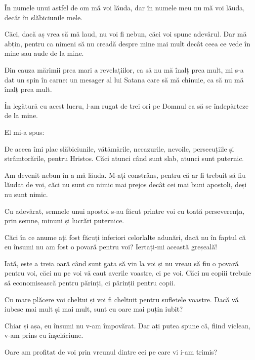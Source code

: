 {În numele unui astfel de om mă voi lăuda, dar în numele meu nu mă voi lăuda, decât în slăbiciunile mele.

Căci, dacă aș vrea să mă laud, nu voi fi nebun, căci voi spune adevărul. Dar mă abțin, pentru ca nimeni să nu creadă despre mine mai mult decât ceea ce vede în mine sau aude de la mine.

Din cauza mărimii prea mari a revelațiilor, ca să nu mă înalț prea mult, mi s-a dat un spin în carne: un mesager al lui Satana care să mă chinuie, ca să nu mă înalț prea mult.

În legătură cu acest lucru, l-am rugat de trei ori pe Domnul ca să se îndepărteze de la mine.

El mi-a spus:
{}


\par }{\PP {}De aceea îmi plac slăbiciunile, vătămările, necazurile, nevoile, persecuțiile și strâmtorările, pentru Hristos. Căci atunci când sunt slab, atunci sunt puternic.

Am devenit nebun în a mă lăuda. M-ați constrâns, pentru că ar fi trebuit să fiu lăudat de voi, căci nu sunt cu nimic mai prejos decât cei mai buni apostoli, deși nu sunt nimic.

Cu adevărat, semnele unui apostol s-au făcut printre voi cu toată perseverența, prin semne, minuni și lucrări puternice.

Căci în ce anume ați fost făcuți inferiori celorlalte adunări, dacă nu în faptul că eu însumi nu am fost o povară pentru voi? Iertați-mi această greșeală!


\par }{\PP {}Iată, este a treia oară când sunt gata să vin la voi și nu vreau să fiu o povară pentru voi, căci nu pe voi vă caut averile voastre, ci pe voi. Căci nu copiii trebuie să economisească pentru părinți, ci părinții pentru copii.

Cu mare plăcere voi cheltui și voi fi cheltuit pentru sufletele voastre. Dacă vă iubesc mai mult și mai mult, sunt eu oare mai puțin iubit?

Chiar și așa, eu însumi nu v-am împovărat. Dar ați putea spune că, fiind viclean, v-am prins cu înșelăciune.

Oare am profitat de voi prin vreunul dintre cei pe care vi i-am trimis?

}
